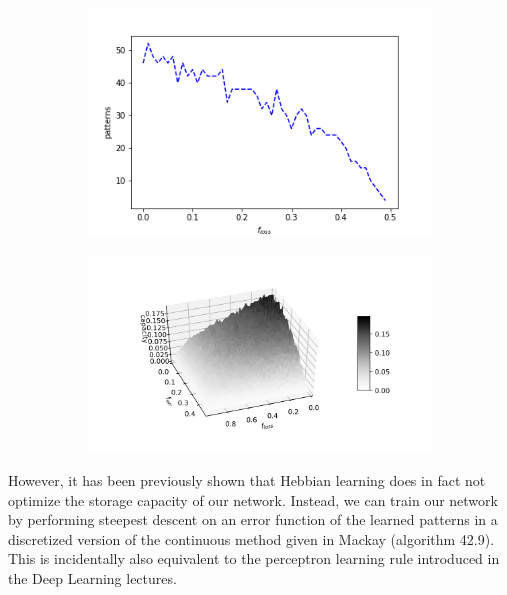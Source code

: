\documentclass{article}
\begin{document}
\begin{figure}[h]
	\centering
	\begin{subfigure}[t]{0.44\linewidth}
		\centering
		\includegraphics[width = 1.0\linewidth, trim={0 0 0 0}, clip=true]{floss_thresh.png}
		\label{fig:flossthresh}	
	\end{subfigure}%
	\hspace{0.05\linewidth}
	\begin{subfigure}[t]{0.44\linewidth}
		\centering
		\includegraphics[width = 1.0\linewidth, trim={90 30 50 40}, clip=true]{test_err_loss.png}
		\label{fig:cap}	
	\end{subfigure}%
\end{figure}

However, it has been previously shown that Hebbian learning does in fact not optimize the storage capacity of our network. Instead, we can train our network by performing steepest descent on an error function of the learned patterns in a discretized version of the continuous method given in Mackay (algorithm 42.9). This is incidentally also equivalent to the perceptron learning rule introduced in the Deep Learning lectures.
\end{document}
